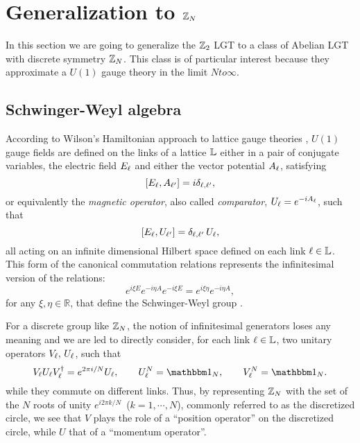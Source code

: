 \section{Generalization to \texorpdfstring{$\mathbb{Z}_N$}{Z\_N}}%
\label{sec:generalization_to_zn}
In this section we are going to generalize the $\mathbb{Z}_2$ LGT to a class of Abelian LGT with discrete symmetry $\mathbb{Z}_N$.
This class is of particular interest because they approximate a $U(1)$ gauge theory in the limit $N to \infty$.



%
%
\subsection{Schwinger-Weyl algebra}%
\label{sub:schwinger_weyl_algebra}

According to Wilson's Hamiltonian approach to lattice gauge theories \cite{wilson1974confinement}, $U(1)$ gauge fields are defined on the links of a lattice $\mathbb{L}$ either in a pair of conjugate variables, the electric field  $E_\ell$ and either the vector potential $A_\ell$, satisfying
\begin{equation}
    \comm{E_\link}{A_{\link^{\prime}}}  = i \delta_{\link , \link^{\prime} },
\end{equation}
or equivalently the \emph{magnetic operator}, also called \emph{comparator},
$U_\ell = e^{-i A_{\ell} }$, such that
\begin{equation}
    \comm{E_\link}{U_{\link^{\prime}}} =  \delta_{\link , \link^{\prime} } \, U_{\link},
\end{equation}
all acting on an infinite dimensional Hilbert space defined on each link $\ell \in \mathbb{L}$.
This form of the canonical commutation relations represents the infinitesimal version of the relations:
\begin{equation}
     e^{i\xi E} e^{-i\eta A } e^{-i\xi E} = e^{i\xi \eta} e^ {-i\eta A },
\end{equation}
for any $\xi, \eta \in \mathbb{R}$,
that define the Schwinger-Weyl group \cite{notarnicola2015discrete, ercolessi2018znmodels, schwinger1960unitary}.

For a discrete group like $\mathbb{Z}_N$, the notion of infinitesimal generators loses any meaning and we are led to directly consider, for each link $\ell \in \mathbb{L}$, two unitary operators
$V_\ell, \, U_\ell$, such that \cite{schwinger1960unitary, schwinger2001symbolism}
\begin{equation}
    V_\link U_\link V_\link^{\dagger}=e^{2\pi i/N}U_\link, \qquad
    U_\link^N=\identity_N, \qquad
    V_\link^N=\identity_N.
    \label{eq:schwinger_weyl_algebra}
\end{equation}
while they commute on different links.
Thus, by representing $\mathbb{Z}_N$  with the set of the $N$ roots of unity $e^{i 2 \pi k/N}$\, ($k=1, \cdots, N$), commonly referred to as the discretized circle,
we see that $V$ plays the role of a ``position operator'' on the discretized circle, while $U$ that of a ``momentum operator''.


